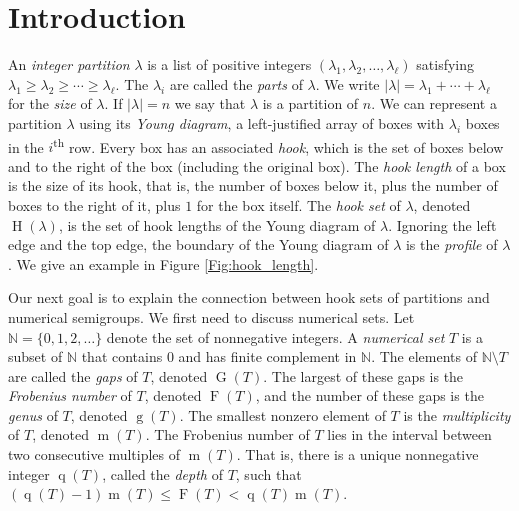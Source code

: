 \documentclass{amsproc}
\newcommand{\N}{\mathbb{N}}
\DeclareMathOperator{\F}{F}
\DeclareMathOperator{\G}{G}
\DeclareMathOperator{\m}{m}
\DeclareMathOperator{\g}{g}
\DeclareMathOperator{\Hook}{H}
\DeclareMathOperator{\q}{q}
\theoremstyle{definition}
\theoremstyle{remark}
\numberwithin{equation}{section}
\begin{document}
\section{Introduction}

An \emph{integer partition} $\lambda$ is a list of positive integers $(\lambda_1,\lambda_2,\ldots, \lambda_\ell)$ satisfying $\lambda_1 \ge \lambda_2 \ge \cdots \ge \lambda_\ell$.  The $\lambda_i$ are called the \emph{parts} of $\lambda$.  We write $|\lambda| = \lambda_1 + \cdots + \lambda_\ell$ for the \emph{size} of $\lambda$.  If $|\lambda| = n$ we say that $\lambda$ is a partition of $n$.  We can represent a partition $\lambda$ using its \emph{Young diagram}, a left-justified array of boxes with $\lambda_i$ boxes in the $i$\textsuperscript{th} row.
Every box has an associated \emph{hook}, which is the set of boxes below and to the right of the box (including the original box).
The \emph{hook length} of a box is the size of its hook, that is, the number of boxes below it, plus the number of boxes to the right of it, plus $1$ for the box itself.
The \emph{hook set} of $\lambda$, denoted $\Hook(\lambda)$, is the set of hook lengths of the Young diagram of $\lambda$.  Ignoring the left edge and the top edge, the boundary of the Young diagram of $\lambda$ is the \emph{profile} of $\lambda$.  We give an example in Figure \ref{Fig:hook_length}.



Our next goal is to explain the connection between hook sets of partitions and numerical semigroups.  We first need to discuss numerical sets.  Let $\N = \{0,1,2,\ldots\}$ denote the set of nonnegative integers.  A \emph{numerical set} $T$ is a subset of $\N$ that contains $0$ and has finite complement in $\N$.  The elements of $\N\setminus T$ are called the \emph{gaps} of $T$, denoted $\G(T)$.  The largest of these gaps is the \emph{Frobenius number} of $T$, denoted $\F(T)$, and the number of these gaps is the \emph{genus} of $T$, denoted $\g(T)$.  The smallest nonzero element of $T$ is the \emph{multiplicity} of $T$, denoted $\m(T)$.  The Frobenius number of $T$ lies in the interval between two consecutive multiples of $\m(T)$.  That is, there is a unique nonnegative integer $\q(T)$, called the \emph{depth} of $T$, such that $(\q(T)-1)\m(T) \le \F(T) < \q(T)\m(T)$. 
\end{document}
